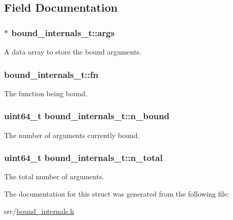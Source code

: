 \subsection{Field Documentation}
\subsubsection[{\texorpdfstring{args}{args}}]{$\ast$ bound\+\_\+internals\+\_\+t\+::args}\hypertarget{structbound__internals__t_a84757175e6e08d7364e8aad728e49985}{}\label{structbound__internals__t_a84757175e6e08d7364e8aad728e49985}


A data array to store the bound arguments. 

\subsubsection[{\texorpdfstring{fn}{fn}}]{ bound\+\_\+internals\+\_\+t\+::fn}\hypertarget{structbound__internals__t_ac9b29b4f9b69674cef9fb3d083b92521}{}\label{structbound__internals__t_ac9b29b4f9b69674cef9fb3d083b92521}


The function being bound. 

\subsubsection[{\texorpdfstring{n\+\_\+bound}{n_bound}}]{\setlength{\rightskip}{0pt plus 5cm}uint64\+\_\+t bound\+\_\+internals\+\_\+t\+::n\+\_\+bound}\hypertarget{structbound__internals__t_aa959691320a507b149ff25164740a323}{}\label{structbound__internals__t_aa959691320a507b149ff25164740a323}


The number of arguments currently bound. 

\subsubsection[{\texorpdfstring{n\+\_\+total}{n_total}}]{\setlength{\rightskip}{0pt plus 5cm}uint64\+\_\+t bound\+\_\+internals\+\_\+t\+::n\+\_\+total}\hypertarget{structbound__internals__t_a804e2e3c6b4c0ca1814c6884ed0bd161}{}\label{structbound__internals__t_a804e2e3c6b4c0ca1814c6884ed0bd161}


The total number of arguments. 



The documentation for this struct was generated from the following file\+:\begin{DoxyCompactItemize}
\item 
src/\hyperlink{bound__internals_8h}{bound\+\_\+internals.\+h}\end{DoxyCompactItemize}
